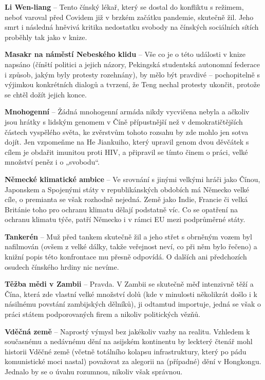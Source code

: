 \textbf{Li Wen-liang} – Tento čínský lékař, který se dostal do konfliktu s režimem, neboť varoval před Covidem již v brzkém začátku pandemie, skutečně žil. Jeho smrt i následná hněvivá kritika nedostatku svobody na čínských sociálních sítích proběhly tak jako v knize. \vspace{0.5cm}

\textbf{Masakr na náměstí Nebeského klidu} – Vše co je o této události v knize napsáno (čínští politici a jejich názory, Pekingská studentská autonomní federace i způsob, jakým byly protesty rozehnány), by mělo být pravdivé – pochopitelně s výjimkou konkrétních dialogů a tvrzení, že Teng nechal protesty ukončit, protože se chtěl dožít jejich konce.\vspace{0.5cm}

\textbf{Mnohogenní} – Žádná mnohogenní armáda nikdy vycvičena nebyla a ačkoliv jsou hrátky s lidským genomem v Číně přípustnější než v demokratičtějších částech vyspělého světa, ke zvěrstvům tohoto rozsahu by zde mohlo jen sotva dojít. Jen vzpomeňme na He Jiankuiho, který upravil genom dvou děvčátek s cílem je obdařit imunitou proti HIV, a připravil se tímto činem o práci, velké množství peněz i o „svobodu“.\vspace{0.5cm}

\textbf{Německé klimatické ambice} – Ve srovnání s jinými velkými hráči jako Čínou, Japonskem a Spojenými státy v republikánských obdobích má Německo velké cíle, o premianta se však rozhodně nejedná. Země jako Indie, Francie či velká Británie toho pro ochranu klimatu dělají podstatně víc. Co se opatření na ochranu klimatu týče, patří Německo i v rámci EU mezi podprůměrné státy.\vspace{0.5cm}

\textbf{Tankerén} – Muž před tankem skutečně žil a jeho střet s obrněným vozem byl nafilmován (ovšem z velké dálky, takže veřejnost neví, co při něm bylo řečeno) a knižní popis této konfrontace mu přesně odpovídá. O dalších ani předchozích osudech čínského hrdiny nic nevíme. \vspace{0.5cm}  

\textbf{Těžba mědi v Zambii} – Pravda. V Zambii se skutečně měď intenzivně těží a Čína, která zde vlastní velké množství dolů (kde v minulosti několikrát došlo i k násilnému povstání zambijských dělníků), ji odtamtud importuje, jedná se však o práci státem podporovaných firem a nikoliv politických vězňů.\vspace{0.5cm}

\textbf{Vděčná země} – Naprostý výmysl bez jakékoliv vazby na realitu. Vzhledem k současnému a nedávnému dění na asijském kontinentu by leckterý čtenář mohl historii Vděčné země (včetně totálního kolapsu infrastruktury, který po pádu komunistické moci nastal) považovat za alegorii na (případné) dění v Hongkongu. Jednalo by se o úvahu rozumnou, nikoliv však správnou. 
